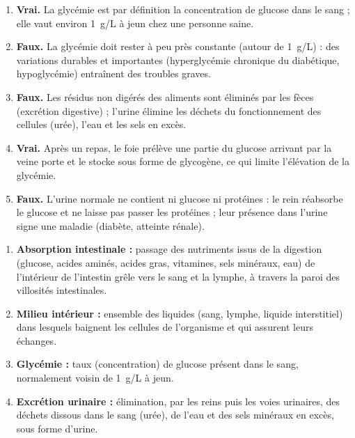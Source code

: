 \documentclass[11pt]{article}
\newcommand{\cle}[1]{{\popxbold\color{popdark}#1}}
\begin{document}
\begin{corrige}
\begin{enumerate}
\item \textbf{Vrai.} La glycémie est par définition la concentration de glucose dans le sang ; elle vaut environ \SI{1}{g/L} à jeun chez une personne saine.
\item \textbf{Faux.} La glycémie doit rester à peu près constante (autour de \SI{1}{g/L}) : des variations durables et importantes (hyperglycémie chronique du diabétique, hypoglycémie) entraînent des troubles graves.
\item \textbf{Faux.} Les résidus non digérés des aliments sont éliminés par les fèces (excrétion digestive) ; l'urine élimine les déchets du fonctionnement des cellules (urée), l'eau et les sels en excès.
\item \textbf{Vrai.} Après un repas, le foie prélève une partie du glucose arrivant par la \cle{veine porte} et le stocke sous forme de \cle{glycogène}, ce qui limite l'élévation de la glycémie.
\item \textbf{Faux.} L'urine normale ne contient ni glucose ni protéines : le rein réabsorbe le glucose et ne laisse pas passer les protéines ; leur présence dans l'urine signe une maladie (diabète, atteinte rénale).
\end{enumerate}
\end{corrige}

\begin{corrige}
\begin{enumerate}
\item \textbf{Absorption intestinale :} passage des nutriments issus de la digestion (glucose, acides aminés, acides gras, vitamines, sels minéraux, eau) de l'intérieur de l'intestin grêle vers le sang et la lymphe, à travers la paroi des villosités intestinales.
\item \textbf{Milieu intérieur :} ensemble des liquides (sang, lymphe, liquide interstitiel) dans lesquels baignent les cellules de l'organisme et qui assurent leurs échanges.
\item \textbf{Glycémie :} taux (concentration) de glucose présent dans le sang, normalement voisin de \SI{1}{g/L} à jeun.
\item \textbf{Excrétion urinaire :} élimination, par les reins puis les voies urinaires, des déchets dissous dans le sang (urée), de l'eau et des sels minéraux en excès, sous forme d'urine.
\end{enumerate}
\end{corrige}
\end{document}
